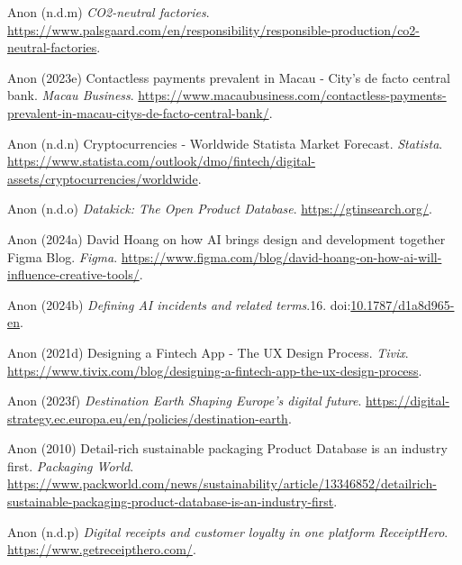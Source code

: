\documentclass[
  letterpaper,
  DIV=11,
  numbers=noendperiod]{scrartcl}
\newlength{\cslhangindent}
\newenvironment{CSLReferences}[2] %
 {\begin{list}{}{%
  \setlength{\itemindent}{0pt}
  \setlength{\leftmargin}{0pt}
  \setlength{\parsep}{0pt}
  \ifodd #1
   \setlength{\leftmargin}{\cslhangindent}
   \setlength{\itemindent}{-1\cslhangindent}
  \fi
  \setlength{\itemsep}{#2\baselineskip}}}
 {\end{list}}
\begin{document}
\begin{CSLReferences}{0}{1}
Anon (n.d.m) \emph{{CO2-neutral} factories}.
\url{https://www.palsgaard.com/en/responsibility/responsible-production/co2-neutral-factories}.

Anon (2023e) Contactless payments prevalent in {Macau} - {City}'s de
facto central bank. \emph{Macau Business}.
\url{https://www.macaubusiness.com/contactless-payments-prevalent-in-macau-citys-de-facto-central-bank/}.

Anon (n.d.n) Cryptocurrencies - {Worldwide} {\textbar} {Statista Market
Forecast}. \emph{Statista}.
\url{https://www.statista.com/outlook/dmo/fintech/digital-assets/cryptocurrencies/worldwide}.

Anon (n.d.o) \emph{Datakick: {The Open Product Database}}.
\url{https://gtinsearch.org/}.

Anon (2024a) David {Hoang} on how {AI} brings design and development
together {\textbar} {Figma Blog}. \emph{Figma}.
\url{https://www.figma.com/blog/david-hoang-on-how-ai-will-influence-creative-tools/}.

Anon (2024b) \emph{Defining {AI} incidents and related terms}.16.
doi:\href{https://doi.org/10.1787/d1a8d965-en}{10.1787/d1a8d965-en}.

Anon (2021d) Designing a {Fintech App} - {The UX Design Process}.
\emph{Tivix}.
\url{https://www.tivix.com/blog/designing-a-fintech-app-the-ux-design-process}.

Anon (2023f) \emph{Destination {Earth} {\textbar} {Shaping Europe}'s
digital future}.
\url{https://digital-strategy.ec.europa.eu/en/policies/destination-earth}.

Anon (2010) Detail-rich sustainable packaging {Product Database} is an
industry first. \emph{Packaging World}.
\url{https://www.packworld.com/news/sustainability/article/13346852/detailrich-sustainable-packaging-product-database-is-an-industry-first}.

Anon (n.d.p) \emph{Digital receipts and customer loyalty in one platform
{\textbar} {ReceiptHero}}. \url{https://www.getreceipthero.com/}.


\end{CSLReferences}
\end{document}
